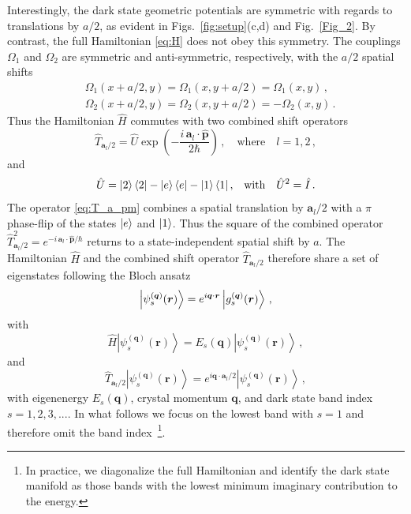 \documentclass[aps,pra,twocolumn,showpacs,superscriptaddress,floatfix,longbibliography]{revtex4-1}
\begin{document}
Interestingly, the dark state geometric potentials are symmetric with regards to translations by $a/2$, as evident in Figs.~\ref{fig:setup}(c,d) and Fig.~\ref{Fig_2}.
By contrast, the full Hamiltonian \eqref{eq:H} does not obey this symmetry. 
The couplings $\Omega_{1}$ and $\Omega_2$ are symmetric and anti-symmetric, respectively, with the $a/2$ spatial shifts
%
\begin{equation}
\begin{aligned}
& \Omega_1(x+a/2,y) = \Omega_1(x,y+a/2) = \Omega_1(x,y) \, , \\
& \Omega_2(x+a/2,y) = \Omega_2(x,y+a/2) = - \Omega_2(x,y) \, .
\end{aligned}
\end{equation}
%
Thus the Hamiltonian $\hat{H}$ commutes with two combined shift operators
\begin{equation}
\hat{T}_{\mathbf{a}_l /2}=\hat{U} \exp\left(  - \frac{ i \, \mathbf{a}_l \cdot \hat{\mathbf{p}}}{2\hbar}   \right)\,,\quad\mathrm{where}\quad l=1,2\,, \label{eq:T_a_pm}
\end{equation}
and
\begin{align}
\hat{U} &= \left|2\right\rangle \left\langle 2\right|-\left|e\right\rangle \left\langle e\right|-\left|1\right\rangle \left\langle 1\right|, & {\rm with} & & \hat U^2 = \hat I\,.\label{eq:U}
\end{align}
The operator \eqref{eq:T_a_pm} combines a spatial translation by $\mathbf{a}_l / 2$ with a $\pi$ phase-flip of the states $\ket{e}$ and $\ket{1}$.
Thus the square of the combined operator $\hat{T}_{\mathbf{a}_l/2}^2 = e^{  - i \, \mathbf{a}_l \cdot \hat{\mathbf{p}} / \hbar }$ returns to a state-independent spatial shift by $a$. The Hamiltonian $\hat{H}$ and the combined shift operator $\hat{T}_{\mathbf{a}_l /2}$ therefore share a set of eigenstates following the Bloch ansatz
\begin{equation}
\ket{\psi_s^{(\boldsymbol{q})}(\boldsymbol{r})} =e^{i\boldsymbol{q}\cdot\boldsymbol{r}} \ket{g_s^{(\boldsymbol{q})}(\boldsymbol{r})} \,,\label{eq:|psi-q>}
\end{equation}
with
\begin{equation}
\hat{H} \left|\psi_s^{(\boldsymbol{q})}(\boldsymbol{r})\right\rangle = E_s(\boldsymbol{q}) \left|\psi_s^{(\boldsymbol{q})}(\boldsymbol{r})\right\rangle \, ,  \label{eq_eigen_H_Bloch}
\end{equation}
and 
\begin{equation}
\hat{T}_{\mathbf{a}_l /2} \left|\psi_s^{(\boldsymbol{q})}(\boldsymbol{r})\right\rangle = e^{i\boldsymbol{q}\cdot \mathbf{a}_l / 2}\left|\psi_s^{(\boldsymbol{q})}(\boldsymbol{r})\right\rangle \,,\label{eq:T_a_pm-eigenvalue}
\end{equation}
%
with eigenenergy $E_s(\boldsymbol{q})$, crystal momentum $\boldsymbol{q}$, and dark state band index $s=1,2,3,...$.
In what follows we focus on the lowest band with $s=1$ and therefore omit the band index~\footnote{In practice, we diagonalize the full Hamiltonian and identify the dark state manifold as those bands with the lowest minimum imaginary contribution to the energy.}.
\end{document}

